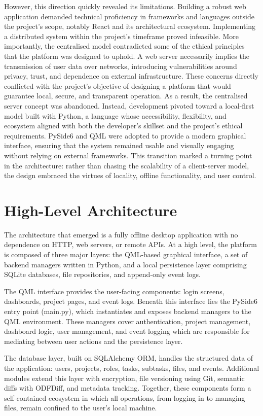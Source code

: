 \documentclass{report}
\begin{document}
However, this direction quickly revealed its limitations. Building a robust web application demanded technical proficiency in frameworks and languages outside the project's scope, notably React and its architectural ecosystem. Implementing a distributed system within the project's timeframe proved infeasible. More importantly, the centralised model contradicted some of the ethical principles that the platform was designed to uphold. A web server necessarily implies the transmission of user data over networks, introducing vulnerabilities around privacy, trust, and dependence on external infrastructure. These concerns directly conflicted with the project's objective of designing a platform that would guarantee local, secure, and transparent operation.
As a result, the centralised server concept was abandoned. Instead, development pivoted toward a local-first model built with Python, a language whose accessibility, flexibility, and ecosystem aligned with both the developer's skillset and the project's ethical requirements. PySide6 and QML were adopted to provide a modern graphical interface, ensuring that the system remained usable and visually engaging without relying on external frameworks. This transition marked a turning point in the architecture: rather than chasing the scalability of a client-server model, the design embraced the virtues of locality, offline functionality, and user control.
\section{High-Level Architecture}

The architecture that emerged is a fully offline desktop application with no dependence on HTTP, web servers, or remote APIs. At a high level, the platform is composed of three major layers: the QML-based graphical interface, a set of backend managers written in Python, and a local persistence layer comprising SQLite databases, file repositories, and append-only event logs.

The QML interface provides the user-facing components: login screens, dashboards, project pages, and event logs. Beneath this interface lies the PySide6 entry point (main.py), which instantiates and exposes backend managers to the QML environment. These managers cover authentication, project management, dashboard logic, user management, and event logging which are responsible for mediating between user actions and the persistence layer.

The database layer, built on SQLAlchemy ORM, handles the structured data of the application: users, projects, roles, tasks, subtasks, files, and events. Additional modules extend this layer with encryption, file versioning using Git, semantic diffs with ODFDiff, and metadata tracking. Together, these components form a self-contained ecosystem in which all operations, from logging in to managing files, remain confined to the user's local machine.
\end{document}
